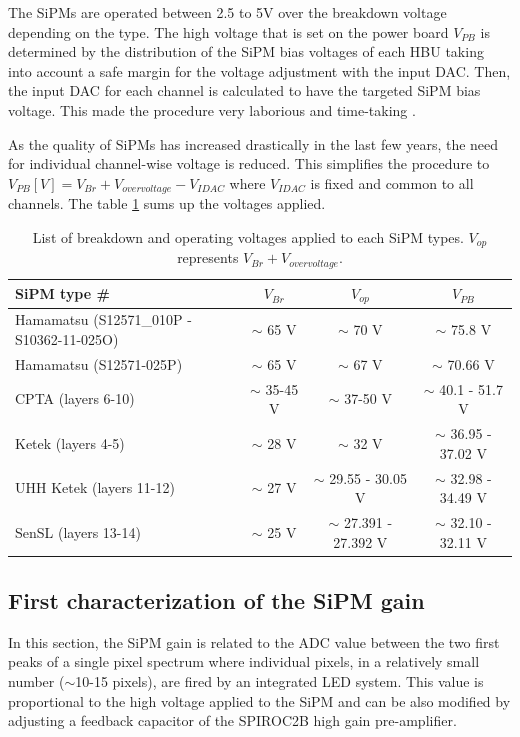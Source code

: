 The SiPMs are operated between 2.5 to 5V over the breakdown voltage depending on the type. The high voltage that is set on the power board $V_{PB}$ is determined by the distribution of the SiPM bias voltages of each HBU taking into account a safe margin for the voltage adjustment with the input DAC. Then, the input DAC for each channel is calculated to have the targeted SiPM bias voltage. This made the procedure very laborious and time-taking \cite{Hartbrich2012}.

As the quality of SiPMs has increased drastically in the last few years, the need for individual channel-wise voltage is reduced. This simplifies the procedure to $V_{PB} [V] = V_{Br} + V_{overvoltage} - V_{IDAC}$ where $V_{IDAC}$ is fixed and common to all channels. The table \ref{table:Voltage_SiPM} sums up the voltages applied.

\begin{table}[htb!]
  \centering
  \caption{List of breakdown and operating voltages applied to each SiPM types. $V_{op}$ represents $V_{Br} + V_{overvoltage}$.}
  \label{table:Voltage_SiPM}
  \begin{tabular}{@{}lccc@{}}
    \toprule
    SiPM type \# & $V_{Br}$ & $V_{op}$ & $V_{PB}$\\
    \midrule
    Hamamatsu (S12571\_010P - S10362-11-025O) & $\sim$ 65 V & $\sim$ 70 V & $\sim$ 75.8 V\\
    Hamamatsu (S12571-025P) & $\sim$ 65 V & $\sim$ 67 V & $\sim$ 70.66 V\\
    CPTA (layers 6-10) & $\sim$ 35-45 V & $\sim$ 37-50 V & $\sim$ 40.1 - 51.7 V\\
    Ketek (layers 4-5) & $\sim$ 28 V & $\sim$ 32 V & $\sim$ 36.95 - 37.02 V\\
    UHH Ketek (layers 11-12) & $\sim$ 27 V & $\sim$ 29.55 - 30.05 V & $\sim$ 32.98 - 34.49 V\\
    SenSL (layers 13-14) & $\sim$ 25 V & $\sim$ 27.391 - 27.392 V & $\sim$ 32.10 - 32.11 V\\
    \bottomrule
  \end{tabular}
\end{table}

\subsection{First characterization of the SiPM gain}
\label{subsec:GainCharac}

In this section, the SiPM gain is related to the ADC value between the two first peaks of a single pixel spectrum where individual pixels, in a relatively small number ($\sim$10-15 pixels), are fired by an integrated LED system. This value is proportional to the high voltage applied to the SiPM and can be also modified by adjusting a feedback capacitor of the SPIROC2B high gain pre-amplifier.

